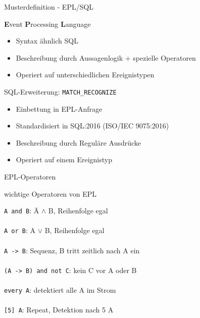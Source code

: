 \documentclass[usenames,dvipsnames]{beamer}
\begin{document}
\begin{frame}{Musterdefinition - EPL/SQL}

\begin{exampleblock}{\textbf{E}vent \textbf{P}rocessing \textbf{L}anguage}
    \begin{itemize}
        \item Syntax ähnlich SQL
        \item Beschreibung durch Aussagenlogik + spezielle Operatoren
        \item Operiert auf unterschiedlichen Ereignistypen
    \end{itemize}

\end{exampleblock}

\begin{exampleblock}{SQL-Erweiterung: \texttt{MATCH\_RECOGNIZE}}
\begin{itemize}
    \item Einbettung in EPL-Anfrage
    \item Standardisiert in SQL:2016 (ISO/IEC 9075:2016)
    \item Beschreibung durch Reguläre Ausdrücke
    \item Operiert auf einem Ereignistyp
\end{itemize}
\end{exampleblock}
   
\end{frame}

\begin{frame}{EPL-Operatoren}

\begin{block}{\centering wichtige Operatoren von EPL}
    \begin{tabbing}
        \texttt{A and B}:\hspace{3cm}  \=   A $\land$ B, Reihenfolge egal\\\\
        \texttt{A or B}: \>     A $\lor$ B, Reihenfolge egal\\\\
        \texttt{A -> B}: \>     Sequenz, B tritt zeitlich nach A ein\\\\
        \texttt{(A -> B) and not C}: \>     kein C vor A oder B\\\\
        \texttt{every A}: \>        detektiert alle A im Strom\\\\
        \texttt{[5] A}: \> Repeat, Detektion nach 5 A          
        
    \end{tabbing}
\end{block}


\end{frame}
\end{document}
